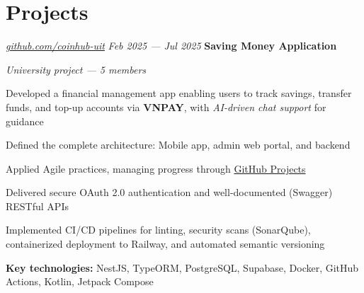 \section{Projects}

\begin{twocolentry}{
		\textit{\href{https://github.com/coinhub-uit}{github.com/coinhub-uit}}
		\textit{Feb 2025 --- Jul 2025}
	}
	\textbf{Saving Money Application}

	\textit{University project — 5 members}
\end{twocolentry}

\begin{onecolentry}
	\begin{highlights}
		\item Developed a financial management app enabling users to track savings, transfer funds, and top-up
		accounts via \textbf{VNPAY}, with \textit{AI-driven chat support} for guidance
		\item Defined the complete architecture: Mobile app, admin web portal, and backend
		\item Applied Agile practices, managing progress through
		\href{https://github.com/orgs/coinhub-uit/projects/1}{GitHub Projects}
		\item Delivered secure OAuth 2.0 authentication and well-documented (Swagger) RESTful APIs
		\item Implemented CI/CD pipelines for linting, security scans (SonarQube), containerized deployment to
		Railway, and automated semantic versioning
		\item \textbf{Key technologies:} NestJS, TypeORM, PostgreSQL, Supabase, Docker, GitHub Actions, Kotlin,
		Jetpack Compose
	\end{highlights}
\end{onecolentry}
